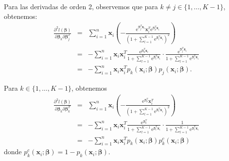 \documentclass{report}
\begin{document}
  
  Para las derivadas de orden 2, observemos que para $k \neq j \in\{1, \ldots, K-1\}$, obtenemos:
  \begin{eqnarray}\label{orden2kj}
  	\frac{\partial^2 l( \boldsymbol{\beta})}{\partial  \boldsymbol{\beta}_k \partial  \boldsymbol{\beta}_j^T} & =&\sum_{i=1}^n \mathbf{x}_i\left(-\frac{\text{e}^{ \boldsymbol{\beta}_j^T \mathbf{x}_i} \mathbf{x}_i^T \text{e}^{ \boldsymbol{\beta}_k^T \mathbf{x}_i}}{\left(1+\sum_{l=1}^{K-1} \text{e}^{ \boldsymbol{\beta}_l^T \mathbf{x}_i}\right)^2}\right)\nonumber  \\
  	& =& -\sum_{i=1}^n \mathbf{x}_i \mathbf{x}_i^T \frac{\text{e}^{ \boldsymbol{\beta}_k^T \mathbf{x}_i}}{1+\sum_{l=1}^{K-1} \text{e}^{ \boldsymbol{\beta}_l^T \mathbf{x}_i}} \cdot \frac{\text{e}^{ \boldsymbol{\beta}_j^T \mathbf{x}_i}}{1+\sum_{l=1}^{K-1} \text{e}^{ \boldsymbol{\beta}_l^T \mathbf{x}_i}} \nonumber \\
  	& =& -\sum_{i=1}^n \mathbf{x}_i \mathbf{x}_i^T p_k\left(\mathbf{x}_i ;  \boldsymbol{\beta}\right) p_j\left(\mathbf{x}_i ;  \boldsymbol{\beta}\right) .
  \end{eqnarray}
  
  
  Para $k \in\{1, \ldots, K-1\}$, obtenemos
  \begin{eqnarray}\label{orden2kk}
  	\frac{\partial^2 l( \boldsymbol{\beta})}{\partial  \boldsymbol{\beta}_k \partial  \boldsymbol{\beta}_k^T} & =&\sum_{i=1}^n \mathbf{x}_i\left(-\frac{\text{e}^{ \boldsymbol{\beta}_k^T} \mathbf{x}_i^T}{\left(1+\sum_{l=1}^{K-1} \text{e}^{ \boldsymbol{\beta}_l^T \mathbf{x}_i}\right)^2}\right)\nonumber  \\
  	& =&-\sum_{i=1}^n \mathbf{x}_i \mathbf{x}_i^T \frac{\text{e}^{ \boldsymbol{\beta}_k^T}}{1+\sum_{l=1}^{K-1} \text{e}^{ \boldsymbol{\beta}_l^T \mathbf{x}_i}} \cdot \frac{1}{1+\sum_{l=1}^{K-1} \text{e}^{ \boldsymbol{\beta}_l^T \mathbf{x}_i}} \nonumber  \\
  	& =&-\sum_{i=1}^n \mathbf{x}_i \mathbf{x}_i^T p_k\left(\mathbf{x}_i ;  \boldsymbol{\beta}\right) p_k^c\left(\mathbf{x}_i ;  \boldsymbol{\beta}\right)
  \end{eqnarray}
  donde  $p_k^c\left(\mathbf{x}_i ;  \boldsymbol{\beta}\right)=1-p_k\left(\mathbf{x}_i ;  \boldsymbol{\beta}\right)$.
  
\end{document}
